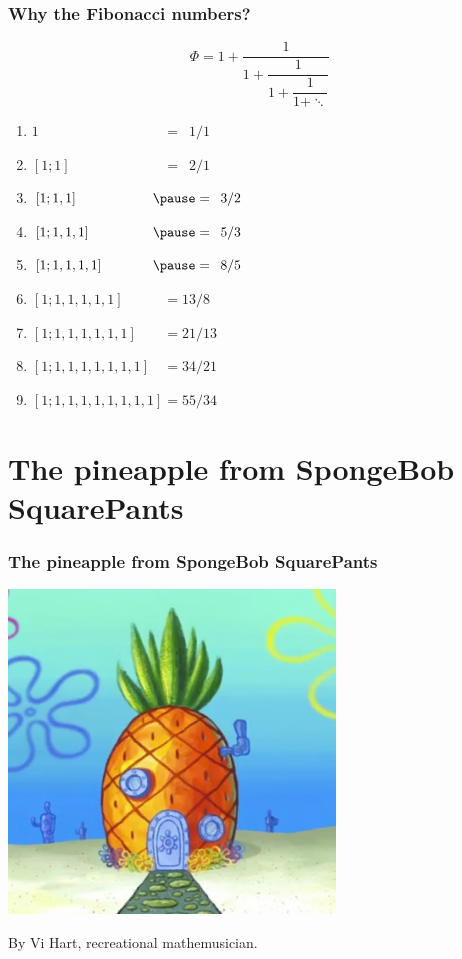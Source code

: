 \documentclass[12pt,compress,english,utf8,t]{beamer}
\newcommand{\icfrac}[4]{#1 + \dfrac{1}{#2 + \dfrac{1}{#3 + \dfrac{1}{#4 + \ddots}}}}
\begin{document}
\begin{frame}\frametitle{Why the Fibonacci numbers?}
  \vspace*{-1em}
  \[ \Phi = \icfrac{1}{1}{1}{1} \]

  \begin{enumerate}
    \item $1\phantom{[,1,1,1,1,1,1,1,1]} = \phantom{0}1/1$
    \item $[1;1]\phantom{,1,1,1,1,1,1,1} = \phantom{0}2/1$
    \item $[1;1,1]\phantom{,1,1,1,1,1,1} \pause = \phantom{0}3/2$
    \item $[1;1,1,1]\phantom{,1,1,1,1,1} \pause = \phantom{0}5/3$
    \item $[1;1,1,1,1]\phantom{,1,1,1,1} \pause = \phantom{0}8/5$ \pause
    \item $[1;1,1,1,1,1]\phantom{,1,1,1} = 13/8$
    \item $[1;1,1,1,1,1,1]\phantom{,1,1} = 21/13$
    \item $[1;1,1,1,1,1,1,1]\phantom{,1} = 34/21$
    \item $[1;1,1,1,1,1,1,1,1] = 55/34$
  \end{enumerate}
\end{frame}


\section{The pineapple from SpongeBob SquarePants}

\begin{frame}\frametitle{The pineapple from SpongeBob SquarePants}
  \centering
  \includegraphics[width=0.65\textwidth]{spongebob-ananas}
  \medskip

  By Vi Hart, recreational mathemusician.
  \par
\end{frame}
\end{document}
